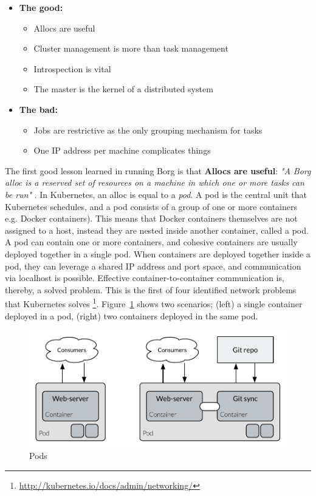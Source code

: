 \begin{itemize}
    \item \textbf{The good:} 
        \begin{itemize}
            \setlength\itemsep{0.05em}
            \vspace{-3mm}
            \item Allocs are useful
            \item Cluster management is more than task management
            \item Introspection is vital
            \item The master is the kernel of a distributed system
        \end{itemize}
    \item \textbf{The bad:} 
        \begin{itemize}
            \setlength\itemsep{0.05em}
            \vspace{-3mm}
            \item Jobs are restrictive as the only grouping mechanism for tasks
            \item One IP address per machine complicates things
        \end{itemize}
\end{itemize} 

\noindent
The first good lesson learned in running Borg is that \textbf{Allocs are useful}: \textit{"A Borg alloc is a reserved set of resources on a machine in which one or more tasks can be run"} \cite[p. 3]{verma2015borg}. In Kubernetes, an alloc is equal to a \textit{pod}. A pod is the central unit that Kubernetes schedules, and a pod consists of a group of one or more containers e.g. Docker containers). This means that Docker containers themselves are not assigned to a host, instead they are nested inside another container, called a pod. A pod can contain one or more containers, and cohesive containers are usually deployed together in a single pod. When containers are deployed together inside a pod, they can leverage a shared IP address and port space, and communication via localhost is possible. Effective container-to-container communication is, thereby, a solved problem. This is the first of four identified network problems that Kubernetes solves \footnote{\url{http://kubernetes.io/docs/admin/networking/}}. Figure~\ref{fig:pods_report} shows two scenarios; (left) a single container deployed in a pod, (right) two containers deployed in the same pod.

\begin{figure}[H]
    \centering
    \includegraphics[width=12cm]{figures/kubernetes/pods}
    \caption{Pods}
    \label{fig:pods_report}
\end{figure}

